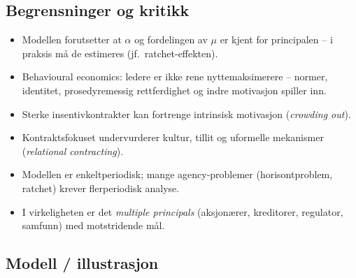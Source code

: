 \subsection*{Begrensninger og kritikk}
\begin{itemize}
\item Modellen forutsetter at $\alpha$ og fordelingen av $\mu$ er kjent for principalen -- i praksis må de estimeres (jf.\ ratchet-effekten).
\item Behavioural economics: ledere er ikke rene nyttemaksimerere -- normer, identitet, prosedyremessig rettferdighet og indre motivasjon spiller inn.
\item Sterke insentivkontrakter kan fortrenge intrinsisk motivasjon (\emph{crowding out}).
\item Kontraktsfokuset undervurderer kultur, tillit og uformelle mekanismer (\emph{relational contracting}).
\item Modellen er enkeltperiodisk; mange agency-problemer (horisontproblem, ratchet) krever flerperiodisk analyse.
\item I virkeligheten er det \emph{multiple principals} (aksjonærer, kreditorer, regulator, samfunn) med motstridende mål.
\end{itemize}

\subsection*{Modell / illustrasjon}

